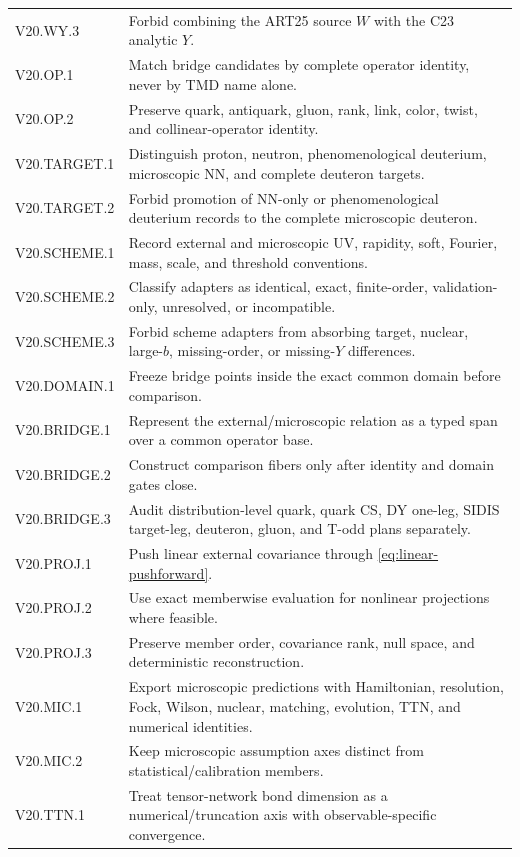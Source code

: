 \documentclass[11pt]{article}
\begin{document}
\begin{longtable}{L{0.19\textwidth}L{0.72\textwidth}}
V20.WY.3 & Forbid combining the ART25 source \(W\) with the C23 analytic \(Y\).\\
V20.OP.1 & Match bridge candidates by complete operator identity, never by TMD name alone.\\
V20.OP.2 & Preserve quark, antiquark, gluon, rank, link, color, twist, and collinear-operator identity.\\
V20.TARGET.1 & Distinguish proton, neutron, phenomenological deuterium, microscopic NN, and complete deuteron targets.\\
V20.TARGET.2 & Forbid promotion of NN-only or phenomenological deuterium records to the complete microscopic deuteron.\\
V20.SCHEME.1 & Record external and microscopic UV, rapidity, soft, Fourier, mass, scale, and threshold conventions.\\
V20.SCHEME.2 & Classify adapters as identical, exact, finite-order, validation-only, unresolved, or incompatible.\\
V20.SCHEME.3 & Forbid scheme adapters from absorbing target, nuclear, large-\(b\), missing-order, or missing-\(Y\) differences.\\
V20.DOMAIN.1 & Freeze bridge points inside the exact common domain before comparison.\\
V20.BRIDGE.1 & Represent the external/microscopic relation as a typed span over a common operator base.\\
V20.BRIDGE.2 & Construct comparison fibers only after identity and domain gates close.\\
V20.BRIDGE.3 & Audit distribution-level quark, quark CS, DY one-leg, SIDIS target-leg, deuteron, gluon, and T-odd plans separately.\\
V20.PROJ.1 & Push linear external covariance through \cref{eq:linear-pushforward}.\\
V20.PROJ.2 & Use exact memberwise evaluation for nonlinear projections where feasible.\\
V20.PROJ.3 & Preserve member order, covariance rank, null space, and deterministic reconstruction.\\
V20.MIC.1 & Export microscopic predictions with Hamiltonian, resolution, Fock, Wilson, nuclear, matching, evolution, TTN, and numerical identities.\\
V20.MIC.2 & Keep microscopic assumption axes distinct from statistical/calibration members.\\
V20.TTN.1 & Treat tensor-network bond dimension as a numerical/truncation axis with observable-specific convergence.\\

\end{longtable}
\end{document}
